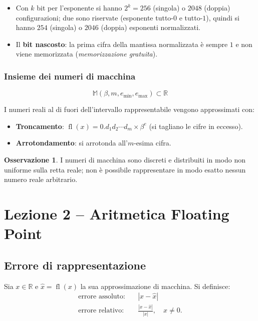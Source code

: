 \documentclass[12pt,a4paper]{article}
\theoremstyle{definition}
\newtheorem{osservazione}{Osservazione}[section]
\begin{document}
\begin{itemize}
  \item Con $k$ bit per l'esponente si hanno $2^k = 256$ (singola) o $2048$ (doppia) configurazioni; due sono riservate (esponente tutto-$0$ e tutto-$1$), quindi si hanno $254$ (singola) o $2046$ (doppia) esponenti normalizzati.
  \item Il \textbf{bit nascosto}: la prima cifra della mantissa normalizzata è sempre $1$ e non viene memorizzata (\emph{memorizzazione gratuita}).
\end{itemize}

\subsubsection{Insieme dei numeri di macchina}

\[
  \mathbb{M}(\beta, m, e_{\min}, e_{\max}) \subset \mathbb{R}
\]

I numeri reali al di fuori dell'intervallo rappresentabile vengono approssimati con:
\begin{itemize}
  \item \textbf{Troncamento}: $\operatorname{fl}(x) = 0.d_1 d_2 \cdots d_m \times \beta^e$ (si tagliano le cifre in eccesso).
  \item \textbf{Arrotondamento}: si arrotonda all'$m$-esima cifra.
\end{itemize}

\begin{osservazione}
I numeri di macchina sono discreti e distribuiti in modo non uniforme sulla retta reale; non è possibile rappresentare in modo esatto nessun numero reale arbitrario.
\end{osservazione}

\section{Lezione 2 -- Aritmetica Floating Point}

\subsection{Errore di rappresentazione}

Sia $x \in \mathbb{R}$ e $\hat{x} = \operatorname{fl}(x)$ la sua approssimazione di macchina. Si definisce:
\begin{align*}
  \text{errore assoluto:} & \quad |x - \hat{x}| \\
  \text{errore relativo:} & \quad \frac{|x - \hat{x}|}{|x|}, \quad x \neq 0.
\end{align*}
\end{document}
